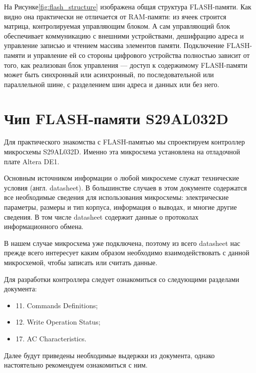 \documentclass[a5paper, DIV=14, headings=openany, twoside=true,fontsize=10pt, titlepage]{scrreprt}
\newcommand{\eng}[1]{\foreignlanguage{english}{#1}}
\begin{document}
\par{На Рисунке\ref{fig:flash_structure} изображена общая структура \eng{FLASH}-памяти. Как видно она практически не отличается от \eng{RAM}-памяти: из ячеек строится матрица, контролируемая управляющим блоком. А сам управляющий блок обеспечивает коммуникацию с внешними устройствами, дешифрацию адреса и управление записью и чтением массива элементов памяти. Подключение \eng{FLASH}-памяти и управление ей со стороны цифрового устройства полностью зависит от того, как реализован блок управления --- доступ к содержимому \eng{FLASH}-памяти может быть синхронный или асинхронный, по последовательной или параллельной шине, с разделением шин адреса и данных или без него.}

% 

\section{Чип \eng{FLASH}-памяти \eng{S29AL032D}}

\par{Для практического знакомства с \eng{FLASH}-памятью мы спроектируем контроллер микросхемы \eng{S29AL032D}. Именно эта микросхема установлена на отладочной плате Altera DE1.}
\par{Основным источником информации о любой микросхеме служат технические условия (англ. \eng{datasheet}). В большинстве случаев в этом документе содержатся все необходимые сведения для использования микросхемы: электрические параметры, размеры и тип корпуса, информация о выводах, и многие другие сведения. В том числе \eng{datasheet} содержит данные о протоколах информационного обмена.}
\par{В нашем случае микросхема уже подключена, поэтому из всего \eng{datasheet} нас прежде всего интересует каким образом необходимо взаимодействовать с данной микросхемой, чтобы записать или считать данные.}
\par{Для разработки контроллера следует ознакомиться со следующими разделами документа:
\begin{itemize}[noitemsep,label={}]
  \item 11. \eng{Commands Definitions};
  \item 12. \eng{Write Operation Status};
  \item 17. \eng{AC Characteristics}.
\end{itemize}}
\par{Далее будут приведены необходимые выдержки из документа, однако настоятельно рекомендуем ознакомиться с ним.}
\end{document}
